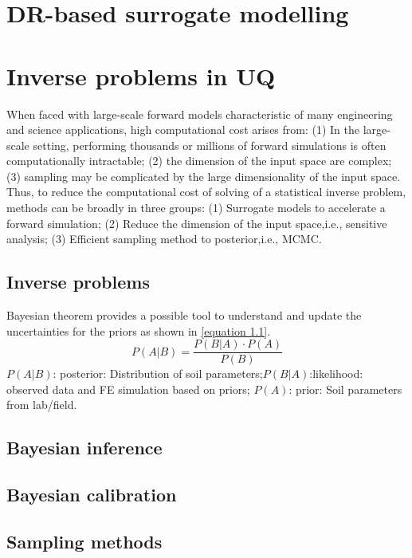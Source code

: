 \section{DR-based surrogate modelling}

\section{Inverse problems in UQ}

When faced with large-scale forward models characteristic of many engineering and science applications, high computational cost arises from: (1) In the large-scale setting, performing thousands or millions of forward simulations is often computationally intractable; (2)  the dimension of the input space are complex; (3) sampling may be complicated by the large dimensionality of the input space. Thus, to reduce the computational cost of solving of a statistical inverse problem, methods can be broadly in three groups: (1) Surrogate models to accelerate a forward simulation; (2) Reduce the dimension of the input space,i.e., sensitive analysis; (3) Efficient sampling method to posterior,i.e., MCMC.



\subsection{Inverse problems}

Bayesian theorem provides a possible tool to understand and update the uncertainties for the priors as shown in \cref{equation 1.1}.
\setlength\abovedisplayskip{2pt}
\setlength\belowdisplayskip{2pt}
\begin{equation}
P(A|B) = \frac{{P(B|A) \cdot P(A)}}{{P(B)}} \label{equation 1.1}
\end{equation}
$P(A|B)$: posterior: Distribution of soil parameters;$P(B|A)$:likelihood: observed data and FE simulation based on priors; $P(A)$: prior: Soil parameters from lab/field.

\subsection{Bayesian inference}

\subsection{Bayesian calibration}

\subsection{Sampling methods}

